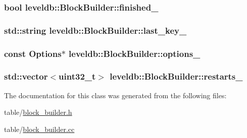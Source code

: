 \subsubsection[{finished\+\_\+}]{\setlength{\rightskip}{0pt plus 5cm}bool leveldb\+::\+Block\+Builder\+::finished\+\_\+\hspace{0.3cm}{\ttfamily [private]}}\label{classleveldb_1_1_block_builder_a15fd67e3114b72c9a27c9309f8ca97f8}
\hypertarget{classleveldb_1_1_block_builder_a546acee0fa90a8e9585f8d369aaf09f3}{}
\subsubsection[{last\+\_\+key\+\_\+}]{\setlength{\rightskip}{0pt plus 5cm}std\+::string leveldb\+::\+Block\+Builder\+::last\+\_\+key\+\_\+\hspace{0.3cm}{\ttfamily [private]}}\label{classleveldb_1_1_block_builder_a546acee0fa90a8e9585f8d369aaf09f3}
\hypertarget{classleveldb_1_1_block_builder_ac3f2a6bc77ee0f695192c54465d59e92}{}
\subsubsection[{options\+\_\+}]{\setlength{\rightskip}{0pt plus 5cm}const {\bf Options}$\ast$ leveldb\+::\+Block\+Builder\+::options\+\_\+\hspace{0.3cm}{\ttfamily [private]}}\label{classleveldb_1_1_block_builder_ac3f2a6bc77ee0f695192c54465d59e92}
\hypertarget{classleveldb_1_1_block_builder_ae3eedf26b4ac597e5190bef0c6b75179}{}
\subsubsection[{restarts\+\_\+}]{\setlength{\rightskip}{0pt plus 5cm}std\+::vector$<${\bf uint32\+\_\+t}$>$ leveldb\+::\+Block\+Builder\+::restarts\+\_\+\hspace{0.3cm}{\ttfamily [private]}}\label{classleveldb_1_1_block_builder_ae3eedf26b4ac597e5190bef0c6b75179}


The documentation for this class was generated from the following files\+:\begin{DoxyCompactItemize}
\item 
table/\hyperlink{block__builder_8h}{block\+\_\+builder.\+h}\item 
table/\hyperlink{block__builder_8cc}{block\+\_\+builder.\+cc}\end{DoxyCompactItemize}
